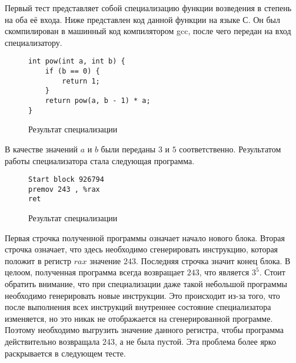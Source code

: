 \documentclass{spbau-diploma}
\begin{document}
Первый тест представляет собой специализацию функции возведения в степень на оба её входа. Ниже представлен код данной функции на языке С. Он был скомпилирован в машинный код компилятором gcc, после чего передан на вход специализатору.
\begin{wrapfigure}{r}{0.5\textwidth}
\begin{lstlisting}[xleftmargin = 20pt]
int pow(int a, int b) {
    if (b == 0) {
        return 1;
    }
    return pow(a, b - 1) * a;
}
\end{lstlisting}
\caption{ Результат специализации}
\label{fig:speckmp}
\end{wrapfigure}
В качестве значений $a$ и $b$ были переданы $3$ и $5$ соответственно. Результатом работы специализатора стала следующая программа.
\begin{wrapfigure}{r}{0.4\textwidth}
\begin{lstlisting}[xleftmargin = 20pt]
Start block 926794
premov 243 , %rax 
ret
\end{lstlisting}
\caption{ Результат специализации}
\label{fig:speckmp}
\end{wrapfigure}
Первая строчка полученной программы означает начало нового блока. Вторая строчка означает, что здесь необходимо сгенерировать инструкцию, которая положит в регистр $rax$ значение $243$. Последняя строчка значит конец блока. В целоом, полученная программа всегда возвращает $243$, что является $3^5$. Стоит обратить внимание, что при специализации даже такой небольшой программы необходимо генерировать новые инструкции. Это происходит из-за того, что после выполнения всех инструкций внутреннее состояние специализатора изменяется, но это никак не отображается на сгенерированной программе. Поэтому необходимо выгрузить значение данного регистра, чтобы программа действительно возвращала $243$, а не была пустой. Эта проблема более ярко раскрывается в следующем тесте.
\end{document}
